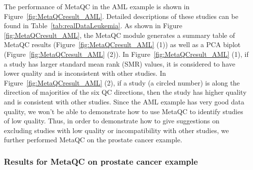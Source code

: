 The performance of MetaQC in the AML example is shown in Figure~\ref{fig:MetaQCresult_AML}.
Detailed descriptions of these studies can be found in Table~\ref{tab:realDataLeukemia}. 
As shown in Figure \ref{fig:MetaQCresult_AML}, 
the MetaQC module generates a summary table of MetaQC results (Figure~\ref{fig:MetaQCresult_AML} {\color{red} (1)}) 
as well as a PCA biplot (Figure~\ref{fig:MetaQCresult_AML} {\color{red} (2)}). 
In Figure~\ref{fig:MetaQCresult_AML} {\color{red} (1)},
if a study has larger standard mean rank (SMR) values, 
it is considered to have lower quality and is inconsistent with other studies.
In Figure~\ref{fig:MetaQCresult_AML} {\color{red} (2)},
if a study (a circled number) is along the direction of majorities of the six QC directions, 
then the study has higher quality and is consistent with other studies.
Since the AML example has very good data quality,
we won't be able to demonstrate how to use MetaQC to identify studies of low quality.
Thus, in order to demonstrate how to give suggestions on excluding studies with low quality or incompatibility with other studies,
we further performed MetaQC on the prostate cancer example.

\subsubsection{Results for MetaQC on prostate cancer example}




